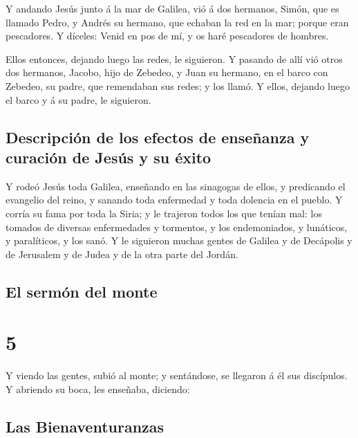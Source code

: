  Y andando Jesús junto á la mar de Galilea, vió á dos
hermanos, Simón, que es llamado Pedro, y Andrés su hermano, que echaban
la red en la mar; porque eran pescadores.  Y díceles:
Venid en pos de mí, y os haré pescadores de hombres.

 Ellos entonces, dejando luego las redes, le siguieron.
 Y pasando de allí vió otros dos hermanos, Jacobo, hijo
de Zebedeo, y Juan su hermano, en el barco con Zebedeo, su padre, que
remendaban sus redes; y los llamó.  Y ellos, dejando
luego el barco y á su padre, le siguieron.

\hypertarget{descripciuxf3n-de-los-efectos-de-enseuxf1anza-y-curaciuxf3n-de-jesuxfas-y-su-uxe9xito}{%
\subsection{Descripción de los efectos de enseñanza y curación de Jesús
y su
éxito}\label{descripciuxf3n-de-los-efectos-de-enseuxf1anza-y-curaciuxf3n-de-jesuxfas-y-su-uxe9xito}}

 Y rodeó Jesús toda Galilea, enseñando en las sinagogas
de ellos, y predicando el evangelio del reino, y sanando toda enfermedad
y toda dolencia en el pueblo.  Y corría su fama por toda
la Siria; y le trajeron todos los que tenían mal: los tomados de
diversas enfermedades y tormentos, y los endemoniados, y lunáticos, y
paralíticos, y los sanó.  Y le siguieron muchas gentes de
Galilea y de Decápolis y de Jerusalem y de Judea y de la otra parte del
Jordán.

\hypertarget{el-sermuxf3n-del-monte}{%
\subsection{El sermón del monte}\label{el-sermuxf3n-del-monte}}

\hypertarget{section-40-5}{%
\section{5}\label{section-40-5}}

 Y viendo las gentes, subió al monte; y sentándose, se
llegaron á él sus discípulos.  Y abriendo su boca, les
enseñaba, diciendo:

\hypertarget{las-bienaventuranzas}{%
\subsection{Las Bienaventuranzas}\label{las-bienaventuranzas}}

